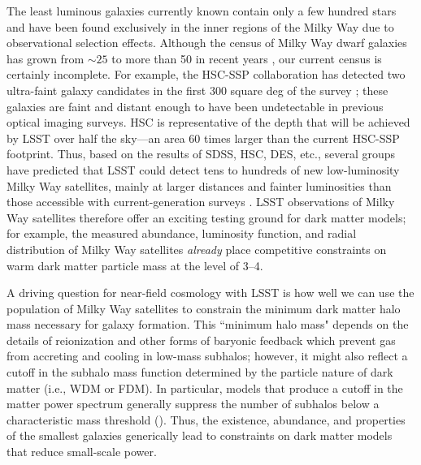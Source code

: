 The least luminous galaxies currently known contain only a few hundred stars and have been found exclusively in the inner regions of the Milky Way due to observational selection effects. Although the census of Milky Way dwarf galaxies has grown from $\sim25$ to more than 50 in recent years \citep[e.g., with DES;][]{Bechtol:2015, Koposov:2015, Drlica-Wagner:2015}, our current census is certainly incomplete.
For example, the HSC-SSP collaboration has detected two ultra-faint galaxy candidates in the first 300 square deg of the survey \citep{1609.04346,1704.05977}; these galaxies are faint and distant enough to have been undetectable in previous optical imaging surveys. HSC is representative of the depth that will be achieved by LSST over half the sky---an area 60 times larger than the current HSC-SSP footprint. Thus, based on the results of SDSS, HSC, DES, etc., several groups have predicted that LSST could detect %
tens to hundreds of new low-luminosity Milky Way satellites, mainly at larger distances and fainter luminosities than those accessible with current-generation surveys \citep{Tollerud:2008,Hargis:2014,Newton:2018,Jethwa:2018,Nadler:2018,Kim:2017iwr}. LSST observations of Milky Way satellites therefore offer an exciting testing ground for dark matter models; for example, the measured abundance, luminosity function, and radial distribution of Milky Way satellites \emph{already} place competitive constraints on warm dark matter particle mass at the level of 3--4\keV \citep[e.g.,][]{Jethwa:2018,Kim:2017iwr}.%

\vspace{1em} 

A driving question for near-field cosmology with LSST is how well we can use the population of Milky Way satellites to constrain the minimum dark matter halo mass necessary for galaxy formation. %
This ``minimum halo mass" depends on the details of reionization and other forms of baryonic feedback which prevent gas from accreting and cooling in low-mass subhalos; however, it might also reflect a cutoff in the subhalo mass function determined by the particle nature of dark matter (i.e., WDM or FDM). In particular, models that produce a cutoff in the matter power spectrum generally suppress the number of subhalos below a characteristic mass threshold (). Thus, the existence, abundance, and properties of the smallest galaxies generically lead to constraints on dark matter models that reduce small-scale power.

